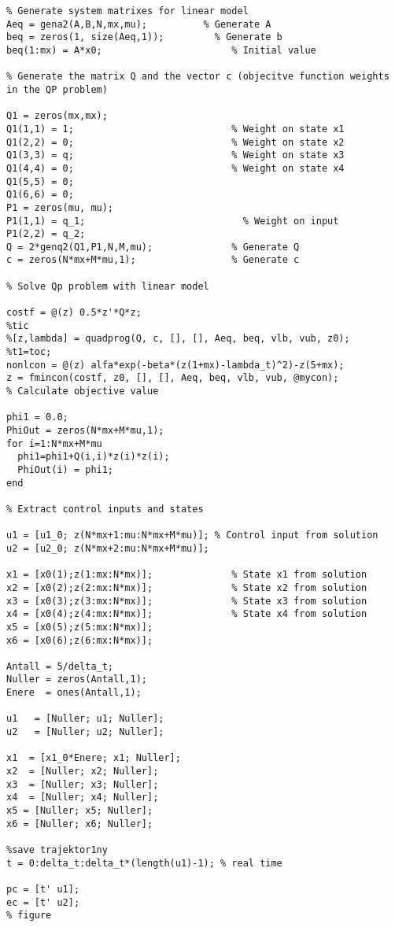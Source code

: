 \begin{lstlisting}
% Generate system matrixes for linear model
Aeq = gena2(A,B,N,mx,mu);          % Generate A
beq = zeros(1, size(Aeq,1));         % Generate b
beq(1:mx) = A*x0; 	        	        % Initial value

% Generate the matrix Q and the vector c (objecitve function weights in the QP problem) 

Q1 = zeros(mx,mx);
Q1(1,1) = 1;                            % Weight on state x1
Q1(2,2) = 0;                            % Weight on state x2
Q1(3,3) = q;                            % Weight on state x3
Q1(4,4) = 0;                            % Weight on state x4
Q1(5,5) = 0;
Q1(6,6) = 0;
P1 = zeros(mu, mu);
P1(1,1) = q_1;                            % Weight on input
P1(2,2) = q_2;
Q = 2*genq2(Q1,P1,N,M,mu);              % Generate Q
c = zeros(N*mx+M*mu,1);                 % Generate c

% Solve Qp problem with linear model

costf = @(z) 0.5*z'*Q*z;
%tic
%[z,lambda] = quadprog(Q, c, [], [], Aeq, beq, vlb, vub, z0);
%t1=toc;
nonlcon = @(z) alfa*exp(-beta*(z(1+mx)-lambda_t)^2)-z(5+mx);
z = fmincon(costf, z0, [], [], Aeq, beq, vlb, vub, @mycon);
% Calculate objective value

phi1 = 0.0;
PhiOut = zeros(N*mx+M*mu,1);
for i=1:N*mx+M*mu
  phi1=phi1+Q(i,i)*z(i)*z(i);
  PhiOut(i) = phi1;
end

% Extract control inputs and states

u1 = [u1_0; z(N*mx+1:mu:N*mx+M*mu)]; % Control input from solution
u2 = [u2_0; z(N*mx+2:mu:N*mx+M*mu)];

x1 = [x0(1);z(1:mx:N*mx)];              % State x1 from solution
x2 = [x0(2);z(2:mx:N*mx)];              % State x2 from solution
x3 = [x0(3);z(3:mx:N*mx)];              % State x3 from solution
x4 = [x0(4);z(4:mx:N*mx)];              % State x4 from solution
x5 = [x0(5);z(5:mx:N*mx)];
x6 = [x0(6);z(6:mx:N*mx)];

Antall = 5/delta_t;
Nuller = zeros(Antall,1);
Enere  = ones(Antall,1);

u1   = [Nuller; u1; Nuller];
u2   = [Nuller; u2; Nuller];

x1  = [x1_0*Enere; x1; Nuller];
x2  = [Nuller; x2; Nuller];
x3  = [Nuller; x3; Nuller];
x4  = [Nuller; x4; Nuller];
x5 = [Nuller; x5; Nuller];
x6 = [Nuller; x6; Nuller];

%save trajektor1ny
t = 0:delta_t:delta_t*(length(u1)-1); % real time

pc = [t' u1];
ec = [t' u2];
% figure
                


\end{lstlisting}
